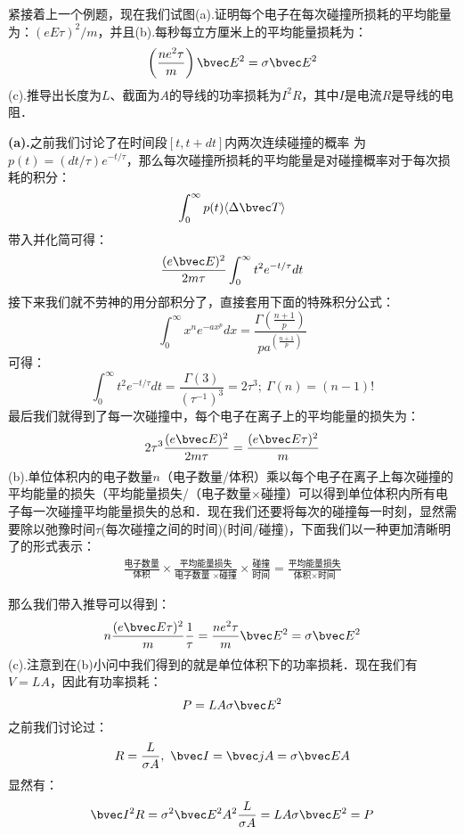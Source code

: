 \begin{exercise}{}
紧接着上一个例题，现在我们试图(a).证明每个电子在每次碰撞所损耗的平均能量为：$(eE\tau)^2/m$，并且(b).每秒每立方厘米上的平均能量损耗为：
\begin{equation}
\left(\frac{ne^2\tau}{m}\right)\bvec E^2=\sigma \bvec E^2
\end{equation}
(c).推导出长度为$L$、截面为$A$的导线的功率损耗为$I^2R$，其中$I$是电流$R$是导线的电阻．

\textbf{(a).}之前我们讨论了在时间段$[t, t + dt]$内两次连续碰撞的概率
为$p(t)=(dt/\tau)e^{- t/\tau}$，那么每次碰撞所损耗的平均能量是对碰撞概率对于每次损耗的积分：
\begin{equation}
\int_0^\infty p(t) \langle\Delta\bvec T\rangle
\end{equation}
带入并化简可得：
\begin{equation}
\frac{(e\bvec E)^2}{2m\tau}\int_0^\infty t^2 e^{- t/\tau}dt
\end{equation}
接下来我们就不劳神的用分部积分了，直接套用下面的特殊积分公式：
\begin{equation}
\int_0^\infty x^n e^{-ax^p}dx = \frac{\Gamma\left(\frac{n+1}{p}\right)}{pa^{\left(\frac{n+1}{p}\right)}}
\end{equation}
可得：
\begin{equation}
\int_0^\infty t^2 e^{- t/\tau}dt=\frac{\Gamma(3)}{(\tau^{-1})^3}=2\tau^3;\ \Gamma(n)=(n-1)!
\end{equation}
最后我们就得到了每一次碰撞中，每个电子在离子上的平均能量的损失为：
\begin{equation}
2\tau^3\frac{(e\bvec E)^2}{2m\tau}=\frac{(e\bvec E\tau)^2}{m}
\end{equation}
(b).单位体积内的电子数量$n$（电子数量/体积）乘以每个电子在离子上每次碰撞的平均能量的损失（平均能量损失/（电子数量$\times$碰撞）可以得到单位体积内所有电子每一次碰撞平均能量损失的总和．现在我们还要将每次的碰撞每一时刻，显然需要除以弛豫时间$\tau$(每次碰撞之间的时间)(时间/碰撞)，下面我们以一种更加清晰明了的形式表示：
\begin{align}
\frac{\mbox{电子数量}}{\mbox{体积}}\times \frac{\mbox{平均能量损失}}{\mbox{电子数量 }\times \mbox{碰撞}}\times\frac{\mbox{碰撞}}{\mbox{时间}}=\frac{\mbox{平均能量损失}}{\mbox{体积}\times \mbox{时间}}
\end{align}

那么我们带入推导可以得到：
\begin{equation}
n \frac{(e\bvec E\tau)^2}{m} \frac{1}{\tau} = \frac{ne^2\tau}{m}\bvec E^2 = \sigma \bvec E^2
\end{equation}
(c).注意到在(b)小问中我们得到的就是单位体积下的功率损耗．现在我们有$V=LA$，因此有功率损耗：
\begin{equation}
P = LA\sigma \bvec E^2
\end{equation}
之前我们讨论过：
\begin{equation}
R = \frac{L}{\sigma A},\ \bvec I = \bvec j A=\sigma\bvec E A
\end{equation}
显然有：
\begin{equation}
\bvec I^2 R=\sigma^2\bvec E^2 A^2 \frac{L}{\sigma A} = LA\sigma \bvec E^2 = P
\end{equation}
\end{exercise}




